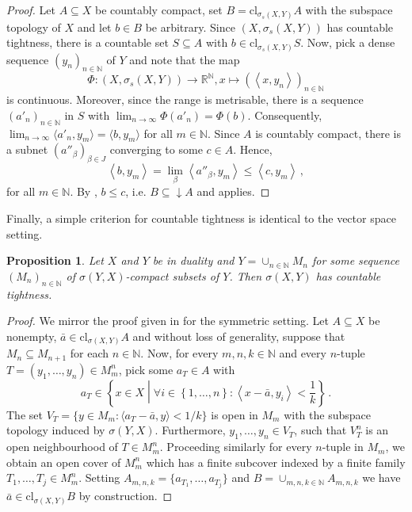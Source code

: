 \documentclass[
	paper=A4,
	pagesize=auto,
	fontsize=12pt
]{scrartcl}
\theoremstyle{plain}
\newtheorem{proposition}[theorem]{Proposition}
\theoremstyle{remark}
\theoremstyle{definition}
\begin{document}
\begin{proof}
Let $A \subseteq X$ be countably compact, set $B = \mathrm{cl}_{\sigma_s(X, Y)} A$ with the subspace topology of $X$ and let $b \in B$ be arbitrary.
Since $(X, \sigma_s(X, Y))$ has countable tightness, there is a countable set $S \subseteq A$ with $b \in \mathrm{cl}_{\sigma_s(X, Y)} S$.
Now, pick a dense sequence $(y_n)_{n \in \mathbb{N}}$ of $Y$ and note that the map
%
\begin{equation}
\Phi : (X, \sigma_s(X, Y)) \to \mathbb{R}^{\mathbb{N}}, x \mapsto \left( \left< x, y_n \right> \right)_{n \in \mathbb{N}}
\end{equation}
%
is continuous.
Moreover, since the range is metrisable, there is a sequence $(a'_n)_{n \in \mathbb{N}}$ in $S$ with $\lim_{n \to \infty} \Phi(a'_n) = \Phi(b)$.
Consequently, $\lim_{n \to \infty} \langle a'_n, y_m \rangle = \langle b, y_m \rangle$ for all $m \in \mathbb{N}$.
Since $A$ is countably compact, there is a subnet $(a''_\beta)_{\beta \in J}$ converging to some $c \in A$.
Hence,
%
\begin{equation}
\left< b, y_m \right>
=
\lim_{\beta} \left< a''_\beta, y_m \right>
\le
\left< c, y_m \right> \, ,
\end{equation}
%
for all $m \in \mathbb{N}$.
By , $b \le c$, i.e. $B \subseteq \downarrow A$ and  applies.
\end{proof}
%
Finally, a simple criterion for countable tightness is identical to the vector space setting.
%
\begin{proposition}
\label{prop:DualIsSigmaCompactImpliesCountableTightness}
Let $X$ and $Y$ be in duality and $Y = \cup_{n \in \mathbb{N}} M_n$ for some sequence $(M_n)_{n \in \mathbb{N}}$ of $\sigma(Y, X)$-compact subsets of $Y$.
Then $\sigma(X, Y)$ has countable tightness.
\end{proposition}
\begin{proof}
We mirror the proof given in \cite[Theorem 3.54]{src:Fabian:BanachSpaceTheory} for the symmetric setting.
Let $A \subseteq X$ be nonempty, $\bar{a} \in \mathrm{cl}_{\sigma(X,Y)} A$ and without loss of generality, suppose that $M_n \subseteq M_{n+1}$ for each $n \in \mathbb{N}$.
Now, for every $m, n, k \in \mathbb{N}$ and every $n$-tuple $T = (y_1, \dots, y_n) \in M_m^n$, pick some $a_T \in A$ with
%
\begin{equation}
a_T \in \left \{ x \in X \middle| \forall i \in \left \{ 1, \dots, n \right \} : \left< x - \bar{a}, y_i \right> < \frac{1}{k} \right\} \, .
\end{equation}
%
The set $V_T = \{ y \in M_m : \langle a_T - \bar{a}, y \rangle < 1/k \}$ is open in $M_m$ with the subspace topology induced by $\sigma(Y, X)$.
Furthermore, $y_1, \dots, y_n \in V_T$, such that $V_T^n$ is an open neighbourhood of $T \in M_m^n$.
Proceeding similarly for every $n$-tuple in $M_m$, we obtain an open cover of $M_m^n$ which has a finite subcover indexed by a finite family $T_1, \dots, T_j \in M_m^n$.
Setting $A_{m,n,k} = \{ a_{T_1}, \dots, a_{T_j} \}$ and $B = \cup_{m,n,k \in \mathbb{N}} A_{m,n,k}$ we have $\bar{a} \in \mathrm{cl}_{\sigma(X,Y)} B$ by construction.
\end{proof}
%
%
\end{document}
